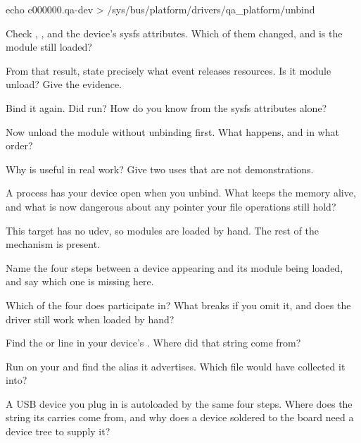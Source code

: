 \begin{shell}
echo c000000.qa-dev > /sys/bus/platform/drivers/qa_platform/unbind
\end{shell}

\noindent Check , ,  and the device's sysfs
attributes. Which of them changed, and is the module still loaded?

 From that result, state precisely what event releases  resources. Is it module
unload? Give the evidence.

 Bind it again. Did  run? How do you know from the sysfs attributes alone?

 Now unload the module without unbinding first. What happens, and in what order?

 Why is  useful in real work? Give two uses that are not demonstrations.

 A process has your device open when you unbind. What keeps the memory alive, and what is
now dangerous about any pointer your file operations still hold?

\label{c10:ex:8}

This target has no udev, so modules are loaded by hand. The rest of the mechanism is present.

 Name the four steps between a device appearing and its module being loaded, and say which
one is missing here.

 Which of the four does  participate in? What breaks if you omit
it, and does the driver still work when loaded by hand?

 Find the  or  line in your device's .
Where did that string come from?

 Run  on your  and find the alias it advertises. Which file would
 have collected it into?

 A USB device you plug in is autoloaded by the same four steps. Where does the string its
 carries come from, and why does a device soldered to the board need a device tree to
supply it?

\label{c10:ex:9}

